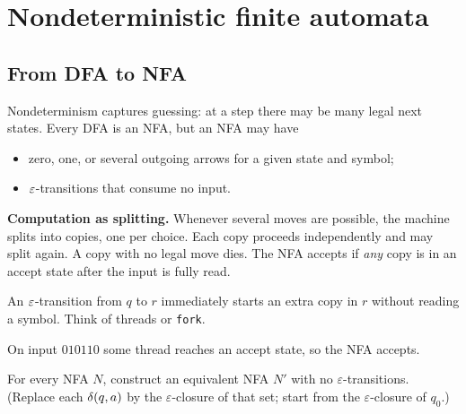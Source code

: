 \section{Nondeterministic finite automata}
\label{ch:nfa}

\subsection{From DFA to NFA}
Nondeterminism captures guessing: at a step there may be
many legal next states. Every DFA is an NFA, but an NFA may have
\begin{itemize}
  \item zero, one, or several outgoing arrows for a given state and symbol;
  \item $\varepsilon$-transitions that consume no input.
\end{itemize}

\textbf{Computation as splitting.} Whenever several moves are possible, the
machine splits into copies, one per choice. Each copy proceeds independently
and may split again. A copy with no legal move dies. The NFA accepts if
\emph{any} copy is in an accept state after the input is fully read.

An $\varepsilon$-transition from $q$ to $r$ immediately starts an extra copy in $r$
without reading a symbol. Think of threads or \texttt{fork}.

\begin{example}
\begin{center}
\end{center}
On input $010110$ some thread reaches an accept state, so the NFA accepts.
\end{example}

\begin{exercise}
For every NFA $N$, construct an equivalent NFA $N'$ with no $\varepsilon$-transitions.
(Replace each $\delta(q,a)$ by the $\varepsilon$-closure of that set; start
from the $\varepsilon$-closure of $q_0$.)
\end{exercise}

